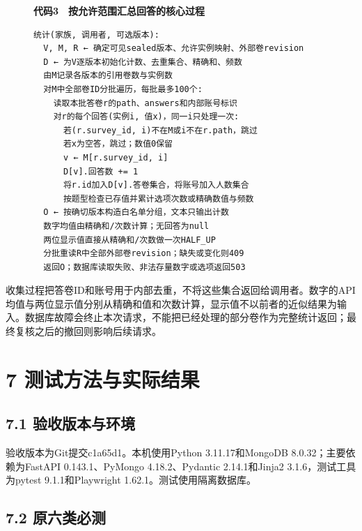 \begin{figure}[t]
\centering\begin{minipage}{\linewidth}
\small\textbf{代码3　按允许范围汇总回答的核心过程}\par\smallskip
\begin{Verbatim}[fontsize=\footnotesize,breaklines=true,breakanywhere=true,frame=single,framesep=5pt,rulecolor=\color{linkblue!45}]
统计(家族, 调用者, 可选版本):
  V, M, R ← 确定可见sealed版本、允许实例映射、外部卷revision
  D ← 为V逐版本初始化计数、去重集合、精确和、频数
  由M记录各版本的引用卷数与实例数
  对M中全部卷ID分批遍历，每批最多100个:
    读取本批答卷r的path、answers和内部账号标识
    对r的每个回答(实例i, 值x)，同一i只处理一次:
      若(r.survey_id, i)不在M或i不在r.path，跳过
      若x为空答，跳过；数值0保留
      v ← M[r.survey_id, i]
      D[v].回答数 += 1
      将r.id加入D[v].答卷集合，将账号加入人数集合
      按题型检查已存值并累计选项次数或精确数值与频数
  O ← 按确切版本构造白名单分组，文本只输出计数
  数字均值由精确和/次数计算；无回答为null
  两位显示值直接从精确和/次数做一次HALF_UP
  分批重读R中全部外部卷revision；缺失或变化则409
  返回O；数据库读取失败、非法存量数字或选项返回503
\end{Verbatim}
\end{minipage}\end{figure}

收集过程把答卷ID和账号用于内部去重，不将这些集合返回给调用者。数字的API均值与两位显示值分别从精确和值和次数计算，显示值不以前者的近似结果为输入。数据库故障会终止本次请求，不能把已经处理的部分卷作为完整统计返回；最终复核之后的撤回则影响后续请求。

\section{7 测试方法与实际结果}\label{ux6d4bux8bd5ux65b9ux6cd5ux4e0eux5b9eux9645ux7ed3ux679c}

\subsection{7.1 验收版本与环境}\label{ux9a8cux6536ux7248ux672cux4e0eux73afux5883}

验收版本为Git提交c1a65d1。本机使用Python 3.11.17和MongoDB 8.0.32；主要依赖为FastAPI 0.143.1、PyMongo 4.18.2、Pydantic 2.14.1和Jinja2 3.1.6，测试工具为pytest 9.1.1和Playwright 1.62.1。测试使用隔离数据库。

\subsection{7.2 原六类必测}\label{ux539fux516dux7c7bux5fc5ux6d4b}

